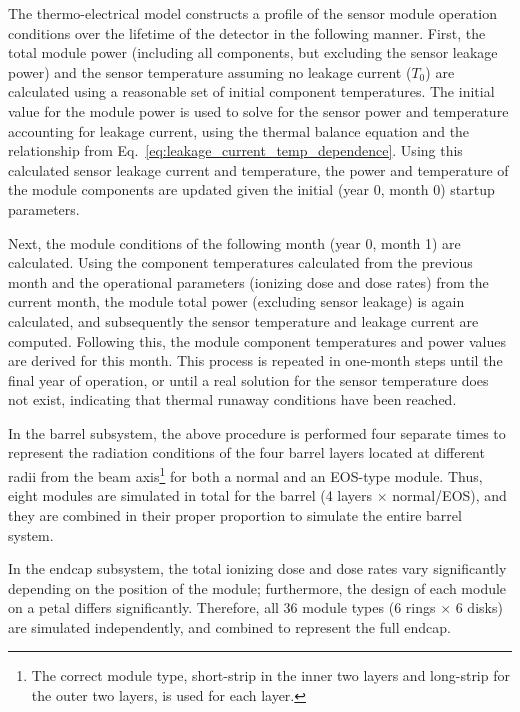 \label{sec:running}
The thermo-electrical model constructs a profile of the sensor module operation conditions over the
lifetime of the detector in the following manner. First, the total module power (including all components, but excluding the sensor
leakage power) and the sensor temperature assuming no leakage current ($T_0$) are calculated 
using a reasonable set of initial component temperatures.
The initial value for the module power is used to solve for the sensor power and temperature accounting
for leakage current, using the thermal balance equation and the relationship from
Eq.~\ref{eq:leakage_current_temp_dependence}.
Using this calculated sensor leakage current and temperature, the power and temperature of the module
components are updated given the initial (year 0, month 0) startup parameters.

Next, the module conditions of the following month (year 0, month 1) are calculated. Using the component
temperatures calculated from the previous month and the operational parameters (ionizing dose and dose
rates) from the current month, the module total power (excluding sensor leakage) is again calculated, and
subsequently the sensor temperature and leakage current are computed. Following this,
the module component temperatures and power values are derived for this month. This process is repeated in one-month
steps until the final year of operation, or until a real solution for the sensor temperature does not
exist, indicating that thermal runaway conditions have been reached.

In the barrel subsystem, the above procedure is performed four separate times to
represent the radiation conditions of the four barrel layers located at different radii from the beam axis\footnote{The correct module type, short-strip in the inner two layers and long-strip for the outer two layers, is used for each layer.} for both a normal and an EOS-type module. Thus, eight modules are simulated in total for the barrel (4 layers $\times$ normal/EOS), and they are combined in their proper proportion to simulate the entire barrel system.

In the endcap subsystem, the total ionizing dose and dose rates vary significantly depending on the
position of the module; furthermore, the design of each module on a petal differs significantly.
Therefore, all 36 module types (6 rings $\times$ 6 disks) are simulated independently, and combined to
represent the full endcap.

